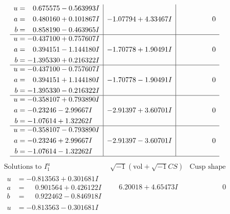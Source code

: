 \documentclass[1p]{elsarticle_modified}
\theoremstyle{definition}
\newcommand{\I}{\sqrt{-1}}
\begin{document}
$$\begin{array}{c|c|c}
\begin{aligned}
u &= \phantom{-}0.675575 - 0.563993 I \\
a &= \phantom{-}0.480160 + 0.101867 I \\
b &= \phantom{-}0.858190 - 0.463965 I\end{aligned}
 & -1.07794 + 4.33467 I & \phantom{-0.000000 } 0 \\ \hline\begin{aligned}
u &= -0.437100 + 0.757607 I \\
a &= \phantom{-}0.394151 - 1.144180 I \\
b &= -1.395330 + 0.216322 I\end{aligned}
 & -1.70778 + 1.90491 I & \phantom{-0.000000 } 0 \\ \hline\begin{aligned}
u &= -0.437100 - 0.757607 I \\
a &= \phantom{-}0.394151 + 1.144180 I \\
b &= -1.395330 - 0.216322 I\end{aligned}
 & -1.70778 - 1.90491 I & \phantom{-0.000000 } 0 \\ \hline\begin{aligned}
u &= -0.358107 + 0.793890 I \\
a &= -0.23246 - 2.99667 I \\
b &= -1.07614 + 1.32262 I\end{aligned}
 & -2.91397 + 3.60701 I & \phantom{-0.000000 } 0 \\ \hline\begin{aligned}
u &= -0.358107 - 0.793890 I \\
a &= -0.23246 + 2.99667 I \\
b &= -1.07614 - 1.32262 I\end{aligned}
 & -2.91397 - 3.60701 I & \phantom{-0.000000 } 0\\
 \hline 
 \end{array}$$\newpage$$\begin{array}{c|c|c}  
\text{Solutions to }I^u_{1}& \I (\text{vol} + \sqrt{-1}CS) & \text{Cusp shape}\\
 \hline 
\begin{aligned}
u &= -0.813563 + 0.301681 I \\
a &= \phantom{-}0.901564 + 0.426122 I \\
b &= \phantom{-}0.922462 - 0.846918 I\end{aligned}
 & \phantom{-}6.20018 + 4.65473 I & \phantom{-0.000000 } 0 \\ \hline\begin{aligned}
u &= -0.813563 - 0.301681 I \\

\end{aligned}
\end{array}$$
\end{document}
